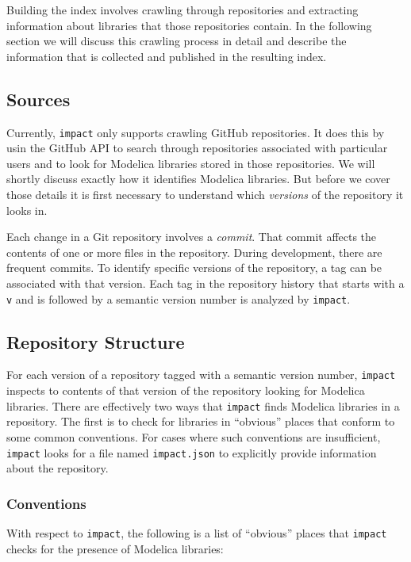 \documentclass[11pt,a4paper,twocolumn]{article}
\newcommand{\code}[1]{\texttt{#1}} %
\begin{document}
Building the index involves crawling through repositories and
extracting information about libraries that those repositories
contain.  In the following section we will discuss this crawling
process in detail and describe the information that is collected and
published in the resulting index.

\subsection{Sources}

Currently, \code{impact} only supports crawling GitHub\cite{github}
repositories.  It does this by usin the GitHub API\cite{gh-api} to
search through repositories associated with particular users and to
look for Modelica libraries stored in those repositories.  We will
shortly discuss exactly how it identifies Modelica libraries.  But
before we cover those details it is first necessary to understand
which {\em versions} of the repository it looks in.

Each change in a Git repository involves a {\em commit}.  That commit
affects the contents of one or more files in the repository.  During
development, there are frequent commits.  To identify specific
versions of the repository, a tag can be associated with that
version.  Each tag in the repository history that starts with a
\code{v} and is followed by a semantic version number is analyzed by
\code{impact}.

\subsection{Repository Structure}

For each version of a repository tagged with a semantic version
number, \code{impact} inspects to contents of that version of the
repository looking for Modelica libraries.  There are effectively two
ways that \code{impact} finds Modelica libraries in a repository.  The
first is to check for libraries in ``obvious'' places that conform to
some common conventions.  For cases where such conventions are
insufficient, \code{impact} looks for a file named \code{impact.json}
to explicitly provide information about the repository.

\subsubsection{Conventions}

With respect to \code{impact}, the following is a list of ``obvious''
places that \code{impact} checks for the presence of Modelica
libraries:
\end{document}
